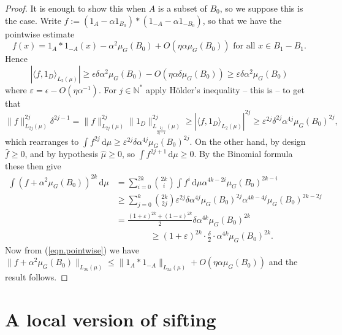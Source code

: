 \documentclass[12pt,reqno]{amsart}
\providecommand{\N}{\mathbb{N}}
\providecommand{\wh}{\widehat}
\newcommand{\dd}{\,\mathrm{d}}
\numberwithin{equation}{section}
\begin{document}
\begin{proof}
It is enough to show this when $A$ is a subset of ${B_0}$, so we suppose this is the case. Write $f:=(1_A - \alpha1_{B_0}) \ast (1_{-A}-\alpha1_{-{B_0}})$, so that we have the pointwise estimate
\begin{equation}\label{eqn.pointwise}
f(x)=1_A \ast 1_{-A}(x) -\alpha^2\mu_G({B_0})+O(\eta\alpha \mu_G({B_0}))\text{ for all }x \in B_1-B_1.
\end{equation}
Hence
\begin{equation*}
|\langle f,1_D\rangle_{L_2(\mu)}|\geq \epsilon \delta \alpha^2\mu_G({B_0}) - O(\eta \alpha \delta \mu_G({B_0})) \geq \varepsilon \delta \alpha^2\mu_G({B_0})
\end{equation*}
where $\varepsilon = \epsilon -O(\eta \alpha^{-1})$. For $j\in \N^*$ apply H{\"o}lder's inequality -- this is \cite[Step 1, pp23]{Bloom:2023aa} -- to get that
\begin{equation*}
\|f\|_{L_{2j}(\mu)}^{2j} \delta^{2j-1}=\|f\|_{L_{2j}(\mu)}^{2j}\|1_D\|_{L_{\frac{2j}{2j-1}}(\mu)}^{2j} \geq |\langle f,1_D\rangle_{L_2(\mu)}|^{2j} \geq \varepsilon^{2j}\delta^{2j} \alpha^{4j}\mu_G({B_0})^{2j},
\end{equation*}
which rearranges to $\int{f^{2j}\dd\mu}  \geq \varepsilon^{2j}\delta \alpha^{4j}\mu_G({B_0})^{2j}$. On the other hand, by design $\wh{f} \geq 0$, and by hypothesis $\wh{\mu}\geq 0$, so $\int{f^{2j+1}\dd\mu} \geq 0$. By the Binomial formula these then give
\begin{align*}
\int{(f+\alpha^2\mu_G({B_0}))^{2k} \dd\mu} &= \sum_{i=0}^{2k}{\binom{2k}{i}\int{f^i\dd\mu}\alpha^{4k-2i}\mu_G({B_0})^{2k-i}}\\ & \geq \sum_{j=0}^k{\binom{2k}{2j}\varepsilon^{2j}\delta \alpha^{4j}\mu_G({B_0})^{2j}\alpha^{4k-4j}\mu_G({B_0})^{2k-2j}}\\ &=\frac{(1+\varepsilon)^{2k}+(1-\varepsilon)^{2k}}{2}\delta \alpha^{4k}\mu_G({B_0})^{2k}\\ & \qquad \qquad \geq (1+\varepsilon)^{2k}\cdot \frac{\delta}{2}\cdot \alpha^{4k}\mu_G({B_0})^{2k}.
\end{align*}
Now from (\ref{eqn.pointwise}) we have $\|f + \alpha^2\mu_G({B_0})\|_{L_{2k}(\mu)} \leq \|1_A \ast 1_{-A}\|_{L_{2k}(\mu)} + O(\eta \alpha \mu_G({B_0}))$ and the result follows.
\end{proof}

\section{A local version of sifting}\label{ap.sift}
\end{document}
